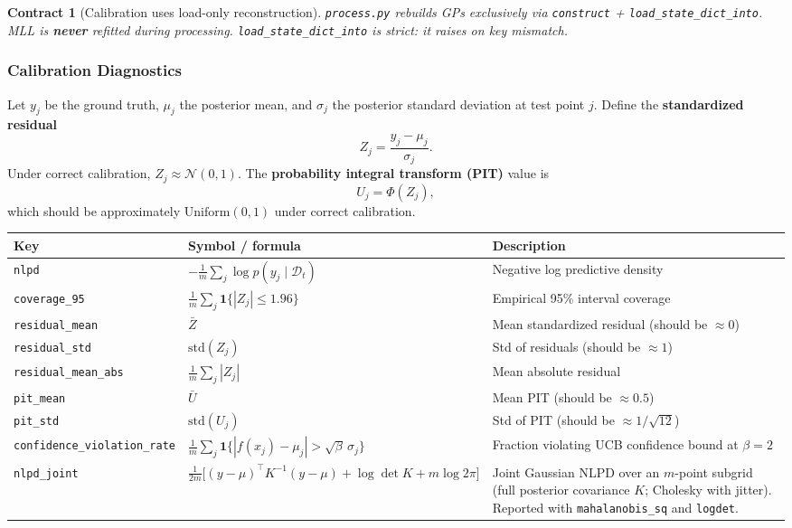 \documentclass[11pt]{article}
\newtheorem{contract}{Contract}
\begin{document}
\begin{contract}[Calibration uses load-only reconstruction]
\label{contract:no-refit}
\texttt{process.py} rebuilds GPs exclusively via
\texttt{construct} + \texttt{load\_state\_dict\_into}.
MLL is \textbf{never} refitted during processing.
\texttt{load\_state\_dict\_into} is strict: it raises on key mismatch.
\end{contract}
 
\subsubsection{Calibration Diagnostics}
\label{sec:calib-diag}
 
Let $y_j$ be the ground truth, $\mu_j$ the posterior mean, and $\sigma_j$ the posterior
standard deviation at test point $j$.
Define the \textbf{standardized residual}
\[
  Z_j = \frac{y_j - \mu_j}{\sigma_j}.
\]
Under correct calibration, $Z_j \approx \mathcal{N}(0,1)$.
The \textbf{probability integral transform (PIT)} value is
\[
  U_j = \Phi(Z_j),
\]
which should be approximately $\mathrm{Uniform}(0,1)$ under correct calibration.
 
\begin{center}
\begin{tabular}{llp{6.5cm}}
\toprule
Key & Symbol / formula & Description \\
\midrule
\texttt{nlpd}
  & $-\frac{1}{m}\sum_j \log p(y_j \mid \mathcal{D}_t)$
  & Negative log predictive density \\
\texttt{coverage\_95}
  & $\frac{1}{m}\sum_j \mathbf{1}\{|Z_j|\le 1.96\}$
  & Empirical 95\% interval coverage \\
\texttt{residual\_mean}
  & $\bar{Z}$
  & Mean standardized residual (should be $\approx 0$) \\
\texttt{residual\_std}
  & $\mathrm{std}(Z_j)$
  & Std of residuals (should be $\approx 1$) \\
\texttt{residual\_mean\_abs}
  & $\frac{1}{m}\sum_j |Z_j|$
  & Mean absolute residual \\
\texttt{pit\_mean}
  & $\bar{U}$
  & Mean PIT (should be $\approx 0.5$) \\
\texttt{pit\_std}
  & $\mathrm{std}(U_j)$
  & Std of PIT (should be $\approx 1/\sqrt{12}$) \\
\texttt{confidence\_violation\_rate}
  & $\frac{1}{m}\sum_j \mathbf{1}\{|f(x_j)-\mu_j| > \sqrt{\beta}\,\sigma_j\}$
  & Fraction violating UCB confidence bound at $\beta = 2$ \\
\texttt{nlpd\_joint}
  & $\frac{1}{2m}\bigl[(y{-}\mu)^\top K^{-1}(y{-}\mu) + \log\det K + m\log 2\pi\bigr]$
  & Joint Gaussian NLPD over an $m$-point subgrid (full posterior covariance $K$;
    Cholesky with jitter). Reported with \texttt{mahalanobis\_sq} and \texttt{logdet}. \\
\bottomrule
\end{tabular}
\end{center}
 
\end{document}
